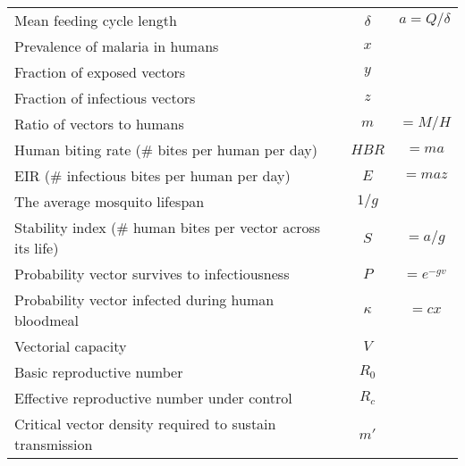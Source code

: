 \begin{table*}[ht]
\begin{tabular}{l c c}
Mean feeding cycle length & $\delta$ & $a=Q/\delta$\\
Prevalence of malaria in humans & $x$ & \\
Fraction of exposed vectors & $y$ & \\
Fraction of infectious vectors & $z$ & \\
Ratio of vectors to humans & $m$ & $=M/H$ \\
Human biting rate (\# bites per human per day) & $HBR$ & $=ma$\\
EIR (\# infectious bites per human per day) & $E$ & $=maz$ \\
The average mosquito lifespan & $1/g$ & \\
Stability index (\# human bites per vector across its life) & $S$ & $=a/g$\\
Probability vector survives to infectiousness & $P$ & $=e^{-gv}$\\
Probability vector infected during human bloodmeal & $\kappa$ & $=cx$\\
Vectorial capacity & $V$ & \\
Basic reproductive number & $R_0$ & \\
Effective reproductive number under control & $R_c$ & \\
Critical vector density required to sustain transmission & $m'$ & \\
\hline%
\end{tabular}
\label{table:param}%
\end{table*}

